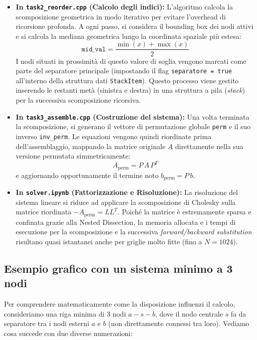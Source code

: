 \documentclass[a4paper,11pt]{article}
\theoremstyle{definition}
\begin{document}
\begin{itemize}
  \item \textbf{In \texttt{task2\_reorder.cpp} (Calcolo degli indici):} 
  L'algoritmo calcola la scomposizione geometrica in modo iterativo per evitare l'overhead di ricorsione profonda. A ogni passo, si considera il bounding box dei nodi attivi e si calcola la mediana geometrica lungo la coordinata spaziale più estesa:
  \[
    \texttt{mid\_val} = \frac{\min(x) + \max(x)}{2}
  \]
  I nodi situati in prossimità di questo valore di soglia vengono marcati come parte del separatore principale (impostando il flag \texttt{separatore = true} all'interno della struttura dati \texttt{StackItem}). Questo processo viene gestito inserendo le restanti metà (sinistra e destra) in una struttura a pila (\emph{stack}) per la successiva scomposizione ricorsiva.
  
  \item \textbf{In \texttt{task3\_assemble.cpp} (Costruzione del sistema):} 
  Una volta terminata la scomposizione, si generano il vettore di permutazione globale \texttt{perm} e il suo inverso \texttt{inv\_perm}. Le equazioni vengono quindi riordinate prima dell'assemblaggio, mappando la matrice originale $A$ direttamente nella sua versione permutata simmetricamente:
  \[
    A_{\text{perm}} = P\,A\,P^T
  \]
  e aggiornando opportunamente il termine noto $b_{\text{perm}} = P\,b$.
  
  \item \textbf{In \texttt{solver.ipynb} (Fattorizzazione e Risoluzione):} 
  La risoluzione del sistema lineare si riduce ad applicare la scomposizione di Cholesky sulla matrice riordinata $-A_{\text{perm}} = L L^T$. Poiché la matrice è estremamente sparsa e confinata grazie alla Nested Dissection, la memoria allocata e i tempi di esecuzione per la scomposizione e la successiva \emph{forward/backward substitution} risultano quasi istantanei anche per griglie molto fitte (fino a $N = 1024$).
\end{itemize}

\subsection{Esempio grafico con un sistema minimo a 3 nodi}

Per comprendere matematicamente come la disposizione influenzi il calcolo, consideriamo una riga minima di 3 nodi $a - s - b$, dove il nodo centrale $s$ fa da separatore tra i nodi esterni $a$ e $b$ (non direttamente connessi tra loro). Vediamo cosa succede con due diverse numerazioni:
\end{document}
